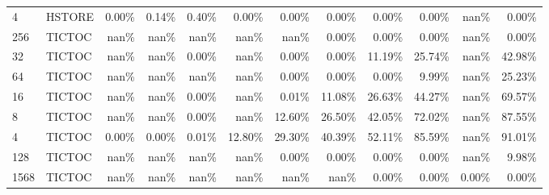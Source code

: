 \begin{tabular}{llrrrrrrrrrr}
4    & HSTORE & 0.00\% & 0.14\% & 0.40\% &  0.00\% &  0.00\% &  0.00\% &  0.00\% &  0.00\% &  nan\% &  0.00\% \\
256  & TICTOC &  nan\% &  nan\% &  nan\% &   nan\% &   nan\% &  0.00\% &  0.00\% &  0.00\% &  nan\% &  0.00\% \\
32   & TICTOC &  nan\% &  nan\% & 0.00\% &   nan\% &  0.00\% &  0.00\% & 11.19\% & 25.74\% &  nan\% & 42.98\% \\
64   & TICTOC &  nan\% &  nan\% &  nan\% &   nan\% &  0.00\% &  0.00\% &  0.00\% &  9.99\% &  nan\% & 25.23\% \\
16   & TICTOC &  nan\% &  nan\% & 0.00\% &   nan\% &  0.01\% & 11.08\% & 26.63\% & 44.27\% &  nan\% & 69.57\% \\
8    & TICTOC &  nan\% &  nan\% & 0.00\% &   nan\% & 12.60\% & 26.50\% & 42.05\% & 72.02\% &  nan\% & 87.55\% \\
4    & TICTOC & 0.00\% & 0.00\% & 0.01\% & 12.80\% & 29.30\% & 40.39\% & 52.11\% & 85.59\% &  nan\% & 91.01\% \\
128  & TICTOC &  nan\% &  nan\% &  nan\% &   nan\% &  0.00\% &  0.00\% &  0.00\% &  0.00\% &  nan\% &  9.98\% \\
1568 & TICTOC &  nan\% &  nan\% &  nan\% &   nan\% &   nan\% &   nan\% &  0.00\% &  0.00\% & 0.00\% &  0.00\% \\
\bottomrule
\end{tabular}

